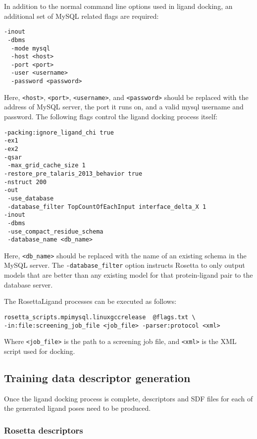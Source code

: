 In addition to the normal command line options used in ligand docking, an additional set of MySQL related flags are required:
\singlespace
\begin{verbatim}
-inout
 -dbms
  -mode mysql
  -host <host>
  -port <port>
  -user <username>
  -password <password>
\end{verbatim}
\doublespace
Here, \texttt{<host>}, \texttt{<port>}, \texttt{<username>}, and \texttt{<password>} should be replaced with the address of MySQL server, the port it runs on, and a valid mysql username and password. 
The following flags control the ligand docking process itself:
\singlespace
\begin{verbatim}
-packing:ignore_ligand_chi true
-ex1
-ex2
-qsar
 -max_grid_cache_size 1
-restore_pre_talaris_2013_behavior true
-nstruct 200
-out
 -use_database
 -database_filter TopCountOfEachInput interface_delta_X 1
-inout
 -dbms
 -use_compact_residue_schema
 -database_name <db_name>
\end{verbatim}
\doublespace
Here, \texttt{<db\_name>} should be replaced with the name of an existing schema in the MySQL server.
The \texttt{-database\_filter} option instructs Rosetta to only output models that are better than any existing model for that protein-ligand pair to the database server. 

The RosettaLigand processes can be executed as follows:
\singlespace
\begin{verbatim}
rosetta_scripts.mpimysql.linuxgccrelease  @flags.txt \
-in:file:screening_job_file <job_file> -parser:protocol <xml>
\end{verbatim}
\doublespace
Where \texttt{<job\_file>} is the path to a screening job file, and \texttt{<xml>} is the XML script used for docking.

\subsection{Training data descriptor generation}

Once the ligand docking process is complete, descriptors and SDF files for each of the generated ligand poses need to be produced.

\subsubsection{Rosetta descriptors}

